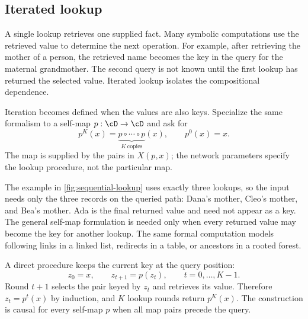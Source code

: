 \documentclass[11pt,twoside]{article}
\theoremstyle{definition}
\theoremstyle{remark}
\begin{document}
\subsection{Iterated lookup}
\label{sec:iterated-lookup}

A single lookup retrieves one supplied fact. Many symbolic computations use
the retrieved value to determine the next operation. For example, after
retrieving the mother of a person, the retrieved name becomes the key in the query for the
maternal grandmother. The second query is not known until the first lookup
has returned the selected value. Iterated lookup isolates the compositional
dependence.

Iteration becomes defined when the values are also keys. Specialize the same
formalism to a self-map $p:\cD\to\cD$ and ask for
\[
 p^K(x)=\underbrace{p\circ\cdots\circ p}_{K\ \text{copies}}(x),
 \qquad p^0(x)=x.
\]
The map is supplied by the pairs in $X(p,x)$; the network parameters specify
the lookup procedure, not the particular map.

The example in \cref{fig:sequential-lookup} uses exactly three lookups, so the
input needs only the three records on the queried path: Dana's mother, Cleo's
mother, and Bea's mother. Ada is the final returned value and need not appear
as a key. The general self-map formulation is needed only when every returned
value may become the key for another lookup. The same formal computation
models following links in a linked list, redirects in a table, or ancestors
in a rooted forest.

A direct procedure keeps the current key at the query position:
\begin{equation}
 z_0=x,
 \qquad z_{t+1}=p(z_t),
 \qquad t=0,\ldots,K-1.
 \label{eq:sequential-lookup}
\end{equation}
Round $t+1$ selects the pair keyed by $z_t$ and retrieves its value. Therefore
$z_t=p^t(x)$ by induction, and $K$ lookup rounds return $p^K(x)$. The
construction is causal for every self-map $p$ when all map pairs precede the
query.
\end{document}
